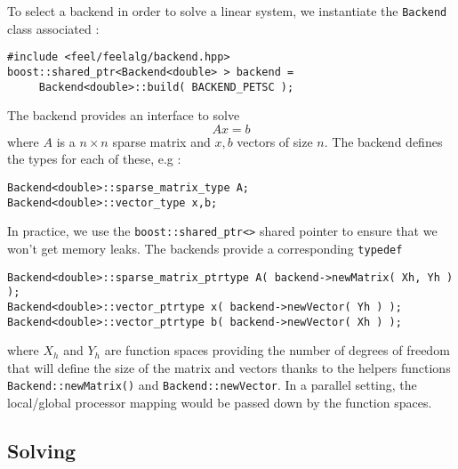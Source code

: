 To select a backend in order to solve a linear system, we instantiate
the \lstinline!Backend! class associated :
\begin{lstlisting}
#include <feel/feelalg/backend.hpp>
boost::shared_ptr<Backend<double> > backend =
     Backend<double>::build( BACKEND_PETSC );
\end{lstlisting}
The backend provides an interface to solve
\begin{equation}
  \label{eq:8}
  A x = b
\end{equation}
where $A$ is a $n \times n $ sparse matrix and $x,b$ vectors of size $n$. The backend defines the \cpp types for  each of these, e.g :
\begin{lstlisting}
Backend<double>::sparse_matrix_type A;
Backend<double>::vector_type x,b;
\end{lstlisting}
In practice, we use the \lstinline!boost::shared_ptr<>! shared pointer
to ensure that we won't get memory leaks. The backends provide a
corresponding \lstinline!typedef!

\begin{lstlisting}
Backend<double>::sparse_matrix_ptrtype A( backend->newMatrix( Xh, Yh ) );
Backend<double>::vector_ptrtype x( backend->newVector( Yh ) );
Backend<double>::vector_ptrtype b( backend->newVector( Xh ) );
\end{lstlisting}
where $X_h$ and $Y_h$ are function spaces providing the number of
degrees of freedom that will define the size of the matrix and vectors
thanks to the helpers functions \lstinline!Backend::newMatrix()! and
\lstinline!Backend::newVector!. In a parallel setting, the
local/global processor mapping would be passed down by the function
spaces.


\subsection{Solving}
\label{sec:solving}

